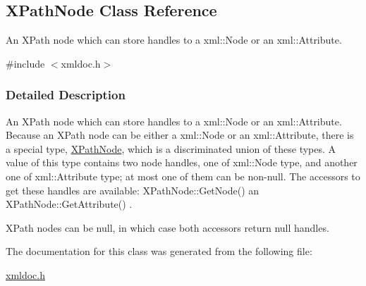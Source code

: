 \hypertarget{classXPathNode}{
\subsection{XPathNode Class Reference}
\label{classXPathNode}
}


An XPath node which can store handles to a xml::Node or an xml::Attribute.  




{\ttfamily \#include $<$xmldoc.h$>$}



\subsubsection{Detailed Description}
An XPath node which can store handles to a xml::Node or an xml::Attribute. Because an XPath node can be either a xml::Node or an xml::Attribute, there is a special type, \hyperlink{classXPathNode}{XPathNode}, which is a discriminated union of these types. A value of this type contains two node handles, one of xml::Node type, and another one of xml::Attribute type; at most one of them can be non-\/null. The accessors to get these handles are available: XPathNode::GetNode() an XPathNode::GetAttribute() . \par
 \par
 XPath nodes can be null, in which case both accessors return null handles. 

The documentation for this class was generated from the following file:\begin{DoxyCompactItemize}
\item 
\hyperlink{xmldoc_8h}{xmldoc.h}\end{DoxyCompactItemize}
